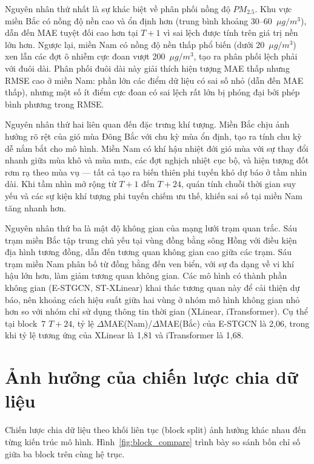 Nguyên nhân thứ nhất là sự khác biệt về phân phối nồng độ $PM_{2.5}$. Khu vực miền Bắc có nồng độ nền cao và ổn định hơn (trung bình khoảng 30--60~$\mu g/m^3$), dẫn đến MAE tuyệt đối cao hơn tại $T{+}1$ vì sai lệch được tính trên giá trị nền lớn hơn. Ngược lại, miền Nam có nồng độ nền thấp phổ biến (dưới 20~$\mu g/m^3$) xen lẫn các đợt ô nhiễm cực đoan vượt 200~$\mu g/m^3$, tạo ra phân phối lệch phải với đuôi dài. Phân phối đuôi dài này giải thích hiện tượng MAE thấp nhưng RMSE cao ở miền Nam: phần lớn các điểm dữ liệu có sai số nhỏ (dẫn đến MAE thấp), nhưng một số ít điểm cực đoan có sai lệch rất lớn bị phóng đại bởi phép bình phương trong RMSE.

Nguyên nhân thứ hai liên quan đến đặc trưng khí tượng. Miền Bắc chịu ảnh hưởng rõ rệt của gió mùa Đông Bắc với chu kỳ mùa ổn định, tạo ra tính chu kỳ dễ nắm bắt cho mô hình. Miền Nam có khí hậu nhiệt đới gió mùa với sự thay đổi nhanh giữa mùa khô và mùa mưa, các đợt nghịch nhiệt cục bộ, và hiện tượng đốt rơm rạ theo mùa vụ --- tất cả tạo ra biến thiên phi tuyến khó dự báo ở tầm nhìn dài. Khi tầm nhìn mở rộng từ $T{+}1$ đến $T{+}24$, quán tính chuỗi thời gian suy yếu và các sự kiện khí tượng phi tuyến chiếm ưu thế, khiến sai số tại miền Nam tăng nhanh hơn.

Nguyên nhân thứ ba là mật độ không gian của mạng lưới trạm quan trắc. Sáu trạm miền Bắc tập trung chủ yếu tại vùng đồng bằng sông Hồng với điều kiện địa hình tương đồng, dẫn đến tương quan không gian cao giữa các trạm. Sáu trạm miền Nam phân bố từ đồng bằng đến ven biển, với sự đa dạng về vi khí hậu lớn hơn, làm giảm tương quan không gian. Các mô hình có thành phần không gian (E-STGCN, ST-XLinear) khai thác tương quan này để cải thiện dự báo, nên khoảng cách hiệu suất giữa hai vùng ở nhóm mô hình không gian nhỏ hơn so với nhóm chỉ sử dụng thông tin thời gian (XLinear, iTransformer). Cụ thể tại block~7 $T{+}24$, tỷ lệ $\Delta$MAE(Nam)/$\Delta$MAE(Bắc) của E-STGCN là 2,06, trong khi tỷ lệ tương ứng của XLinear là 1,81 và iTransformer là 1,68.

\section{Ảnh hưởng của chiến lược chia dữ liệu}
\label{sec:block_comparison}

Chiến lược chia dữ liệu theo khối liên tục (block split) ảnh hưởng khác nhau đến từng kiến trúc mô hình. Hình~\ref{fig:block_compare} trình bày so sánh bốn chỉ số giữa ba block trên cùng hệ trục.

